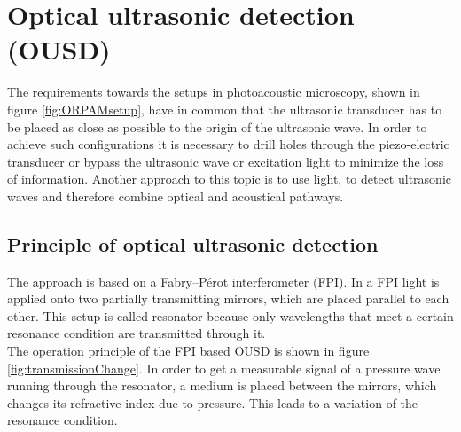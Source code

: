 \section{Optical ultrasonic detection (OUSD)}
\label{sec:OUSD}
The requirements towards the setups in photoacoustic microscopy, shown in figure \ref{fig:ORPAMsetup}, have in common that the ultrasonic transducer has to be placed as close as possible to the origin of the ultrasonic wave. In order to achieve such configurations it is necessary to drill holes through the piezo-electric transducer or bypass the ultrasonic wave or excitation light to minimize the loss of information. Another approach to this topic is to use light, to detect ultrasonic waves and therefore combine optical and acoustical pathways. 

\subsection{Principle of optical ultrasonic detection}

The approach is based on a Fabry–P\'{e}rot interferometer (FPI). In a FPI light is applied onto two partially transmitting mirrors, which are placed parallel to each other. This setup is called resonator because only wavelengths that meet a certain resonance condition are transmitted through it.\\
The operation principle of the FPI based OUSD is shown in figure \ref{fig:transmissionChange}. In order to get a measurable signal of  a pressure wave running through the resonator, a medium is placed between the mirrors, which changes its refractive index due to pressure. This leads to a variation of the resonance condition.

